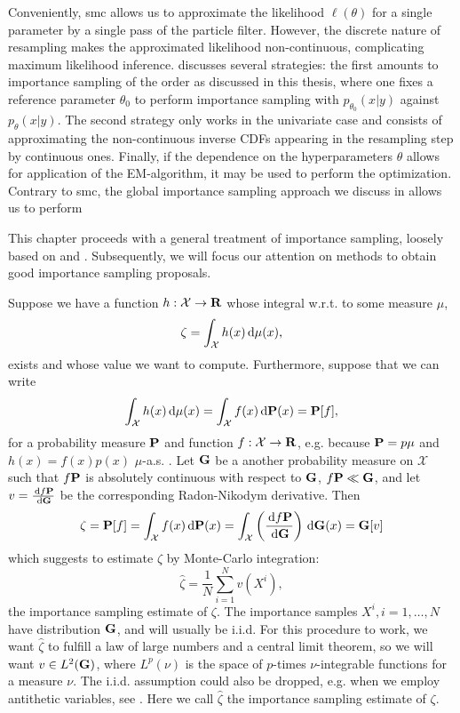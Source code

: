 Conveniently, \gls{smc} allows us to approximate the likelihood $\ell(\theta)$ for a single parameter by a single pass of the particle filter. However, the discrete nature of resampling makes the approximated likelihood non-continuous, complicating maximum likelihood inference. \citep[Chapter 14]{Chopin2020Introduction} discusses several strategies: the first amounts to importance sampling of the order as discussed in this thesis, where one fixes a reference parameter $\theta_{0}$ to perform importance sampling with $p_{\theta_{0}}(x|y)$ against $p_{\theta}(x|y)$. The second strategy only works in the univariate case and consists of approximating the non-continuous inverse CDFs appearing in the resampling step by continuous ones. Finally, if the dependence on the hyperparameters $\theta$ allows for application of the EM-algorithm, it may be used to perform the optimization. 
Contrary to \gls{smc}, the global importance sampling approach we discuss in  allows us to perform 

This chapter proceeds with a general treatment of importance sampling, loosely based on \citep[Chapter 8]{Chopin2020Introduction} and \citep[Chapter 11]{Durbin2012Time}. Subsequently, we will focus our attention on methods to obtain good importance sampling proposals. 

Suppose we have a function $h: \mathcal X \to \R$ whose integral w.r.t. to some measure $\mu$, $$\zeta = \int_{\mathcal X} h(x) \d\mu(x),$$ exists and whose value we want to compute. 
Furthermore, suppose that we can write
$$
    \int_{\mathcal X} h(x) \d \mu(x) = \int_{\mathcal X} f(x) \d \P(x) = \P [f],
$$
for a probability measure $\P$ and function $f: \mathcal X \to \R$, e.g. because $\P = p \mu$ and $h(x) = f(x) p(x)$ $\mu$-a.s. .
Let $\G$ be a another probability measure on $\mathcal X$ such that $f\P$ is absolutely continuous with respect to $\G$, $f\P \ll \G$, and let $v = \frac{\d f\P}{\d\G}$ be the corresponding Radon-Nikodym derivative. Then
$$
    \zeta = \P [f] = \int_{\mathcal X} f(x) \d \P(x) = \int_{\mathcal X} \left(\rnd{f\P}{\G}\right)\d\G(x) = \G [v]
$$
which suggests to estimate $\zeta$ by Monte-Carlo integration: $$\hat \zeta = \frac 1 N \sum_{i=1}^{N} v(X^{i}), $$ the importance sampling estimate of $\zeta$. The importance samples $X^{i}, i = 1, \dots, N$ have distribution $\G$, and will usually be i.i.d. For this procedure to work, we want $\hat \zeta$ to fulfill a law of large numbers and a central limit theorem, so we will want $v \in L^{2}(\G)$, where $L^{p}(\nu)$ is the space of $p$-times $\nu$-integrable functions for a measure $\nu$. The i.i.d. assumption could also be dropped, e.g. when we employ antithetic variables, see \citep[Section 5.3]{Ripley2009Stochastic}. Here we call $\hat \zeta$ the importance sampling estimate of $\zeta$. 

